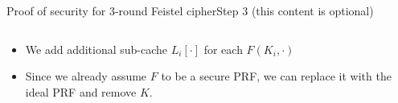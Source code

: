 \documentclass[aspectratio=169, lualatex, handout]{beamer}
\begin{document}
	\begin{frame}{Proof of security for 3-round Feistel cipher}{Step 3 (this content is optional)}
		\begin{columns}[c]
			\begin{column}{0.5\textwidth}
				\begin{itemize}
					\item We add additional sub-cache $L_i[\cdot]$ for each $F(K_i,\cdot)$
					\item Since we already assume $F$ to be a secure PRF, we can replace it with the ideal PRF and remove $K$.
				\end{itemize}
			\end{column}
			\begin{column}{0.5\textwidth}
				\vspace{-1.5cm}
				\begin{center}
				\end{center}
			\end{column}
		\end{columns}
	\end{frame}
\end{document}
